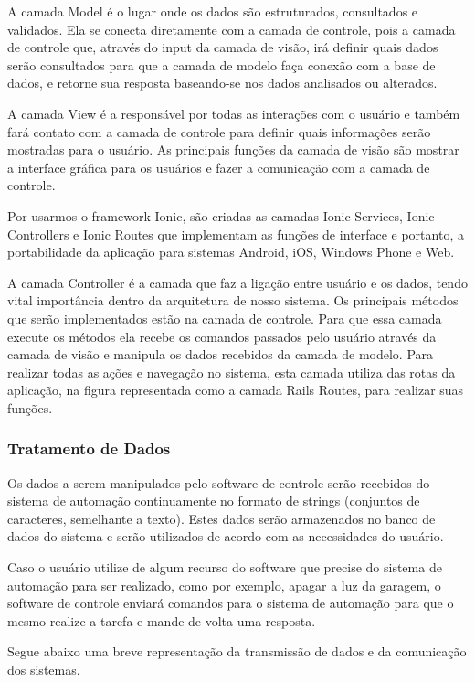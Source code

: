 \par A camada Model é o lugar onde os dados são estruturados, consultados e validados. Ela se conecta diretamente com a camada de controle, pois a camada de controle que, através do input da camada de visão, irá definir quais dados serão consultados para que a camada de modelo faça conexão com a base de dados, e retorne sua resposta baseando-se nos dados analisados ou alterados.
\par A camada View é a responsável por todas as interações com o usuário e também fará contato com a camada de controle para definir quais informações serão mostradas para o usuário. As principais funções da camada de visão são mostrar a interface gráfica para os usuários e fazer a comunicação com a camada de controle.
\par Por usarmos o framework Ionic, são criadas as camadas Ionic Services, Ionic Controllers e Ionic Routes que implementam as funções de interface e portanto, a portabilidade da aplicação para sistemas Android, iOS, Windows Phone e Web.
\par A camada Controller é a camada que faz a ligação entre usuário e os dados, tendo vital importância dentro da arquitetura de nosso sistema. Os principais métodos que serão implementados estão na camada de controle. Para que essa camada execute os métodos ela recebe os comandos passados pelo usuário através da camada de visão e manipula os dados recebidos da camada de modelo. Para realizar todas as ações e navegação no sistema, esta camada utiliza das rotas da aplicação, na figura representada como a camada Rails Routes, para realizar suas funções.

\subsubsection{Tratamento de Dados}
\par Os dados a serem manipulados pelo software de controle serão recebidos do sistema de automação continuamente no formato de strings (conjuntos de caracteres, semelhante a texto). Estes dados serão armazenados no banco de dados do sistema e serão utilizados de acordo com as necessidades do usuário.
\par Caso o usuário utilize de algum recurso do software que precise do sistema de automação para ser realizado, como por exemplo, apagar a luz da garagem, o software de controle enviará comandos para o sistema de automação para que o mesmo realize a tarefa e mande de volta uma resposta.
\par Segue abaixo uma breve representação da transmissão de dados e da comunicação dos sistemas.


